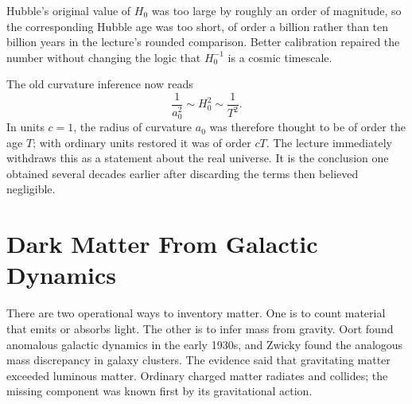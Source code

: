 \begin{classroomqa}
\end{classroomqa}

Hubble's original value of \(H_0\) was too large by roughly an order of magnitude, so the corresponding Hubble age was too short, of order a billion rather than ten billion years in the lecture's rounded comparison. Better calibration repaired the number without changing the logic that \(H_0^{-1}\) is a cosmic timescale.

The old curvature inference now reads
\begin{equation}
\frac{1}{a_0^2}\sim H_0^2\sim\frac{1}{T^2}.
\end{equation}
In units \(c=1\), the radius of curvature \(a_0\) was therefore thought to be of order the age \(T\); with ordinary units restored it was of order \(cT\). The lecture immediately withdraws this as a statement about the real universe. It is the conclusion one obtained several decades earlier after discarding the terms then believed negligible.

\begin{classroomqa}
\end{classroomqa}

\section{Dark Matter From Galactic Dynamics}

There are two operational ways to inventory matter. One is to count material that emits or absorbs light. The other is to infer mass from gravity. Oort found anomalous galactic dynamics in the early 1930s, and Zwicky found the analogous mass discrepancy in galaxy clusters. The evidence said that gravitating matter exceeded luminous matter. Ordinary charged matter radiates and collides; the missing component was known first by its gravitational action.

